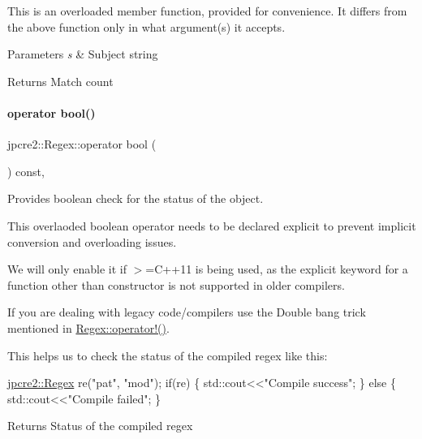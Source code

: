 This is an overloaded member function, provided for convenience. It differs from the above function only in what argument(s) it accepts. 


\begin{DoxyParams}{Parameters}
{\em s} & Subject string \\
\hline
\end{DoxyParams}
\begin{DoxyReturn}{Returns}
Match count 
\end{DoxyReturn}
\hypertarget{classjpcre2_1_1Regex_a9070a9f3adcaebccca5d15b247b93fda_a9070a9f3adcaebccca5d15b247b93fda}{}\label{classjpcre2_1_1Regex_a9070a9f3adcaebccca5d15b247b93fda_a9070a9f3adcaebccca5d15b247b93fda} 
\paragraph{\texorpdfstring{operator bool()}{operator bool()}}
{\footnotesize\ttfamily jpcre2\+::\+Regex\+::operator bool (\begin{DoxyParamCaption}{ }\end{DoxyParamCaption}) const\hspace{0.3cm}{\ttfamily [inline]}, {\ttfamily [explicit]}}



Provides boolean check for the status of the object. 

This overlaoded boolean operator needs to be declared explicit to prevent implicit conversion and overloading issues.

We will only enable it if $>$=C++11 is being used, as the explicit keyword for a function other than constructor is not supported in older compilers.

If you are dealing with legacy code/compilers use the Double bang trick mentioned in \hyperlink{classjpcre2_1_1Regex_afe102e21a96f5cfe12621746f899fa25_afe102e21a96f5cfe12621746f899fa25}{Regex\+::operator!()}.

This helps us to check the status of the compiled regex like this\+:


\begin{DoxyCode}
\hyperlink{classjpcre2_1_1Regex}{jpcre2::Regex} re(\textcolor{stringliteral}{"pat"}, \textcolor{stringliteral}{"mod"});
\textcolor{keywordflow}{if}(re) \{
    std::cout<<\textcolor{stringliteral}{"Compile success"};
\} \textcolor{keywordflow}{else} \{
    std::cout<<\textcolor{stringliteral}{"Compile failed"};
\}
\end{DoxyCode}
 \begin{DoxyReturn}{Returns}
Status of the compiled regex 
\end{DoxyReturn}
\hypertarget{classjpcre2_1_1Regex_afe102e21a96f5cfe12621746f899fa25_afe102e21a96f5cfe12621746f899fa25}{}\label{classjpcre2_1_1Regex_afe102e21a96f5cfe12621746f899fa25_afe102e21a96f5cfe12621746f899fa25} 
